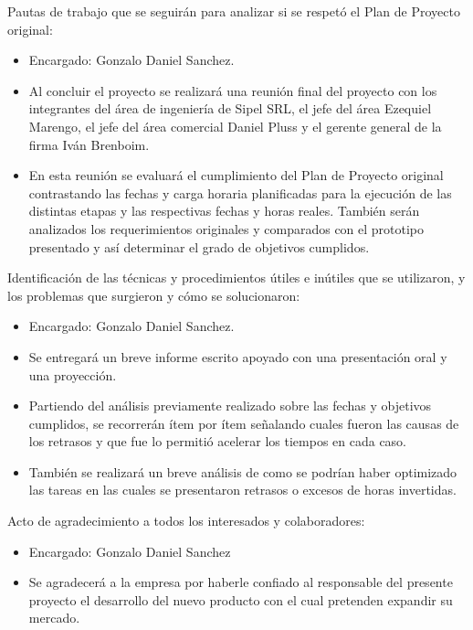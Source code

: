 \documentclass[11pt]{charter}
\begin{document}
Pautas de trabajo que se seguirán para analizar si se respetó el Plan de Proyecto original:
\begin{itemize}
\item Encargado: Gonzalo Daniel Sanchez.
\item Al concluir el proyecto se realizará una reunión final del proyecto con los integrantes del área de ingeniería de Sipel SRL, el jefe del área Ezequiel Marengo, el jefe del área comercial Daniel Pluss y el gerente general de la firma Iván Brenboim. 
\item En esta reunión se evaluará el cumplimiento del Plan de Proyecto original contrastando las fechas y carga horaria planificadas para la ejecución de las distintas etapas y las respectivas fechas y horas reales. También serán analizados los requerimientos originales y comparados con el prototipo presentado y así
determinar el grado de objetivos cumplidos.
\end{itemize}

Identificación de las técnicas y procedimientos útiles e inútiles que se utilizaron, y los problemas
que surgieron y cómo se solucionaron:
\begin{itemize}
\item Encargado: Gonzalo Daniel Sanchez.
\item Se entregará un breve informe escrito apoyado con una presentación oral y una proyección.
\item Partiendo del análisis previamente realizado sobre las fechas y objetivos cumplidos, se recorrerán ítem por ítem señalando cuales fueron las causas de los retrasos y que fue lo permitió acelerar los tiempos en cada caso.
\item También se realizará un breve análisis de como se podrían haber optimizado las tareas en las cuales se presentaron retrasos o excesos de horas invertidas.
\end{itemize}

Acto de agradecimiento a todos los interesados y colaboradores:
\begin{itemize}
\item Encargado: Gonzalo Daniel Sanchez
\item Se agradecerá a la empresa por haberle confiado al responsable del presente proyecto el desarrollo del nuevo producto con el cual pretenden expandir su mercado.
\end{itemize}
\end{document}
